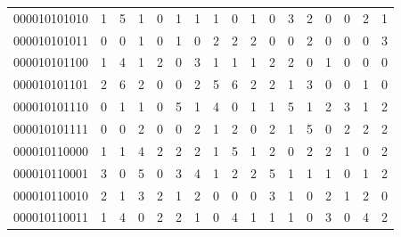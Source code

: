 \documentclass[10pt,a4paper]{article}
\begin{document}
\begin{longtable}{ |c|c|c|c|c|c|c|c|c|c|c|c|c|c|c|c|c| }
    000010101010              & 1                            & 5                                & 1                            & 0                              & 1   & 1   & 1   & 0   & 1   & 0   & 3   & 2   & 0   & 0   & 2   & 1   \\
    000010101011              & 0                            & 0                                & 1                            & 0                              & 1   & 0   & 2   & 2   & 2   & 0   & 0   & 2   & 0   & 0   & 0   & 3   \\
    000010101100              & 1                            & 4                                & 1                            & 2                              & 0   & 3   & 1   & 1   & 1   & 2   & 2   & 0   & 1   & 0   & 0   & 0   \\
    000010101101              & 2                            & 6                                & 2                            & 0                              & 0   & 2   & 5   & 6   & 2   & 2   & 1   & 3   & 0   & 0   & 1   & 0   \\
    000010101110              & 0                            & 1                                & 1                            & 0                              & 5   & 1   & 4   & 0   & 1   & 1   & 5   & 1   & 2   & 3   & 1   & 2   \\
    000010101111              & 0                            & 0                                & 2                            & 0                              & 0   & 2   & 1   & 2   & 0   & 2   & 1   & 5   & 0   & 2   & 2   & 2   \\
    000010110000              & 1                            & 1                                & 4                            & 2                              & 2   & 2   & 1   & 5   & 1   & 2   & 0   & 2   & 2   & 1   & 0   & 2   \\
    000010110001              & 3                            & 0                                & 5                            & 0                              & 3   & 4   & 1   & 2   & 2   & 5   & 1   & 1   & 1   & 0   & 1   & 2   \\
    000010110010              & 2                            & 1                                & 3                            & 2                              & 1   & 2   & 0   & 0   & 0   & 3   & 1   & 0   & 2   & 1   & 2   & 0   \\
    000010110011              & 1                            & 4                                & 0                            & 2                              & 2   & 1   & 0   & 4   & 1   & 1   & 1   & 0   & 3   & 0   & 4   & 2   \\

\end{longtable}
\end{document}
